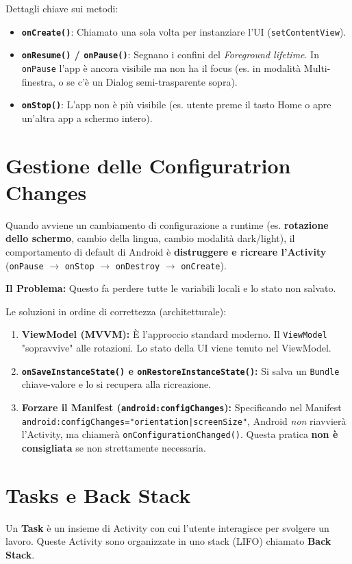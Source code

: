 Dettagli chiave sui metodi:
\begin{itemize}
    \item \textbf{\texttt{onCreate()}}: Chiamato una sola volta per instanziare l'UI (\texttt{setContentView}).
    \item \textbf{\texttt{onResume()} / \texttt{onPause()}}: Segnano i confini del \textit{Foreground lifetime}. In \texttt{onPause} l'app è ancora visibile ma non ha il focus (es.
    in modalità Multi-finestra, o se c'è un Dialog semi-trasparente sopra).
    \item \textbf{\texttt{onStop()}}: L'app non è più visibile (es.
    utente preme il tasto Home o apre un'altra app a schermo intero).
\end{itemize}

\section{Gestione delle Configuratrion Changes}
Quando avviene un cambiamento di configurazione a runtime (es. \textbf{rotazione dello schermo}, cambio della lingua, cambio modalità dark/light),
il comportamento di default di Android è \textbf{distruggere e ricreare l'Activity} (\texttt{onPause} $\rightarrow$ \texttt{onStop} $\rightarrow$ \texttt{onDestroy} $\rightarrow$ \texttt{onCreate}).

\textbf{Il Problema:} Questo fa perdere tutte le variabili locali e lo stato non salvato.

Le soluzioni in ordine di correttezza (architetturale):
\begin{enumerate}
    \item \textbf{ViewModel (MVVM):} È l'approccio standard moderno.
    Il \texttt{ViewModel} "sopravvive" alle rotazioni.
    Lo stato della UI viene tenuto nel ViewModel.
    \item \textbf{\texttt{onSaveInstanceState()} e \texttt{onRestoreInstanceState()}:} Si salva un \texttt{Bundle} chiave-valore e lo si recupera alla ricreazione.
    \item \textbf{Forzare il Manifest (\texttt{android:configChanges}):} Specificando nel Manifest \texttt{android:configChanges="orientation|screenSize"},
    Android \textit{non} riavvierà l'Activity, ma chiamerà \texttt{onConfigurationChanged()}.
    Questa pratica \textbf{non è consigliata} se non strettamente necessaria.
\end{enumerate}

\section{Tasks e Back Stack}
Un \textbf{Task} è un insieme di Activity con cui l'utente interagisce per svolgere un lavoro.
Queste Activity sono organizzate in uno stack (LIFO) chiamato \textbf{Back Stack}.

